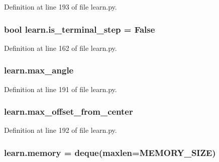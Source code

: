 Definition at line 193 of file learn.\+py.

\subsubsection[{\texorpdfstring{is\+\_\+terminal\+\_\+step}{is_terminal_step}}]{\setlength{\rightskip}{0pt plus 5cm}bool learn.\+is\+\_\+terminal\+\_\+step = False}\hypertarget{namespacelearn_a281a04971ff2288564c37fcf2a144453}{}\label{namespacelearn_a281a04971ff2288564c37fcf2a144453}


Definition at line 162 of file learn.\+py.

\subsubsection[{\texorpdfstring{max\+\_\+angle}{max_angle}}]{\setlength{\rightskip}{0pt plus 5cm}learn.\+max\+\_\+angle}\hypertarget{namespacelearn_a5c5a2877d619463f5d69e7b25222695c}{}\label{namespacelearn_a5c5a2877d619463f5d69e7b25222695c}


Definition at line 191 of file learn.\+py.

\subsubsection[{\texorpdfstring{max\+\_\+offset\+\_\+from\+\_\+center}{max_offset_from_center}}]{\setlength{\rightskip}{0pt plus 5cm}learn.\+max\+\_\+offset\+\_\+from\+\_\+center}\hypertarget{namespacelearn_a7616f004dbc376e458dbaf5310921be4}{}\label{namespacelearn_a7616f004dbc376e458dbaf5310921be4}


Definition at line 192 of file learn.\+py.

\subsubsection[{\texorpdfstring{memory}{memory}}]{\setlength{\rightskip}{0pt plus 5cm}learn.\+memory = deque(maxlen=M\+E\+M\+O\+R\+Y\+\_\+\+S\+I\+ZE)}\hypertarget{namespacelearn_ab19d2fd92231ad109b1bee73faa22b3f}{}\label{namespacelearn_ab19d2fd92231ad109b1bee73faa22b3f}


